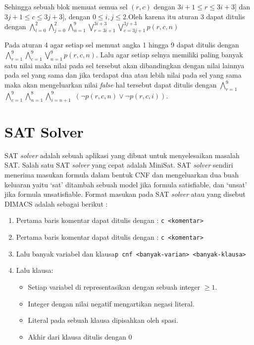 Sehingga sebuah blok memuat semua sel $\left(r,c\right)$ dengan $3i+1\leq r\leq3i+3]$
dan $3j+1\leq c\leq3j+3]$, dengan $0\leq i,j\leq2$.Oleh karena itu aturan 3 dapat ditulis dengan $\bigwedge_{i=0}^{2}$$\bigwedge_{j=0}^{2}$$\bigwedge_{n=1}^{9}$$\bigvee_{r=3i+1}^{3i+3}$$\bigvee_{c=3j+1}^{3j+3}$$p\left(r,c,n\right)$

Pada aturan 4 agar setiap sel memuat angka 1 hingga 9 dapat ditulis dengan $\bigwedge_{r=1}^{9}$$\bigwedge_{c=1}^{9}$$\bigvee_{n=1}^{9}$$p\left(r,c,n\right)$. Lalu agar setiap selnya memiliki paling banyak satu nilai maka nilai pada sel tersebut akan dibandingkan dengan nilai lainnya pada sel yang sama dan jika terdapat dua atau lebih nilai pada sel yang sama maka akan mengeluarkan nilai \textit{false} hal tersebut  dapat ditulis dengan $\bigwedge_{r=1}^{9}$$\bigwedge_{c=1}^{9}$$\bigwedge_{n=1}^{8}$$\bigwedge_{i=n+1}^{9}$
$\left(\neg p\left(r,c,n\right)\vee\neg p\left(r,c,i\right)\right)$.

\section{SAT Solver}

SAT \textit{solver} adalah sebuah aplikasi yang dibuat untuk menyelesaikan masalah SAT. Salah satu SAT \textit{solver} yang cepat adalah MiniSat. SAT \textit{solver} sendiri menerima masukan formula dalam bentuk CNF dan mengeluarkan dua buah keluaran yaitu `sat' ditambah sebuah model jika formula satisfiable, dan `unsat' jika formula unsatisfiable. Format masukan pada SAT \textit{solver} atau yang disebut DIMACS adalah sebagai berikut :

\begin{enumerate}
	\item Pertama baris komentar dapat ditulis dengan : \texttt{c <komentar>}
	\item Pertama baris komentar dapat ditulis dengan : \texttt{c <komentar>}
	\item Lalu banyak variabel dan klausa\texttt{p cnf <banyak-varian> <banyak-klausa>}
	\item Lalu klausa: 
	
	\begin{itemize}
		\item Setiap variabel di representasikan dengan sebuah integer $\geq1$.
		\item Integer dengan nilai negatif mengartikan negasi literal.
		\item Literal pada sebuah klausa dipisahkan oleh spasi.
		\item Akhir dari klausa ditulis dengan 0
	\end{itemize}
\end{enumerate}

